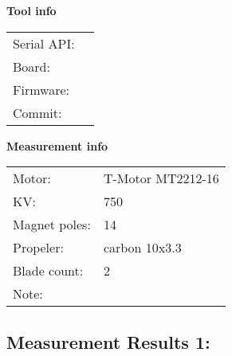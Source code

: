 \documentclass[10pt]{article}
\begin{document}
\noindent
{\large \bf Tool info}
\vspace{3mm}

\noindent
\begin{tabular}{ll}
Serial API:  & \\ 
Board:       & \\ 
Firmware:    & \\ 
Commit:      & 
\end{tabular}
\vspace{3mm}

\noindent
{\large \bf Measurement info}
\vspace{3mm}

\noindent
\begin{tabular}{ll}
Motor:        & T-Motor MT2212-16\\ 
KV:           & 750\\ 
Magnet poles: & 14\\ 
Propeler:     & carbon 10x3.3\\ 
Blade count:  & 2\\ 
Note:         & 
\end{tabular}

\vspace{3mm}


\subsection*{\large \bf Measurement Results 1:}
\end{document}
